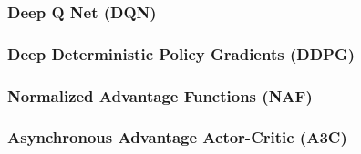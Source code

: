 \documentclass[journal]{IEEEtran}
\begin{document}
\subsubsection{Deep Q Net (DQN)}

\subsubsection{Deep Deterministic Policy Gradients (DDPG)}

\subsubsection{Normalized Advantage Functions (NAF)}

\subsubsection{Asynchronous Advantage Actor-Critic (A3C)}
\end{document}
